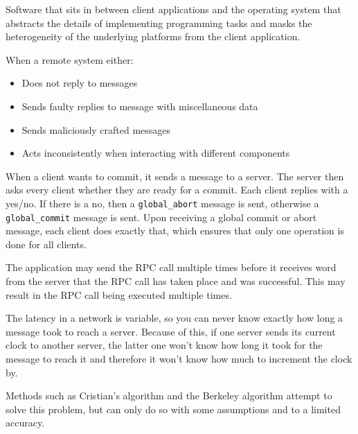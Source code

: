 
Software that sits in between client applications and the operating system that
abstracts the details of implementing programming tasks and masks the
heterogeneity of the underlying platforms from the client application.


When a remote system either:

\begin{itemize}
  \item Does not reply to messages
  \item Sends faulty replies to message with miscellaneous data
  \item Sends maliciously crafted messages
  \item Acts inconsistently when interacting with different components
\end{itemize}


When a client wants to commit, it sends a message to a server. The server then
asks every client whether they are ready for a commit. Each client replies with
a yes/no. If there is a no, then a \texttt{global\_abort} message is sent,
otherwise a \texttt{global\_commit} message is sent. Upon receiving a global
commit or abort message, each client does exactly that, which ensures that only
one operation is done for all clients.


The application may send the RPC call multiple times before it receives word
from the server that the RPC call has taken place and was successful. This may
result in the RPC call being executed multiple times.


The latency in a network is variable, so you can never know exactly how long a
message took to reach a server. Because of this, if one server sends its current
clock to another server, the latter one won't know how long it took for the
message to reach it and therefore it won't know how much to increment the clock
by.

Methods such as Cristian's algorithm and the Berkeley algorithm attempt to solve
this problem, but can only do so with some assumptions and to a limited
accuracy.

